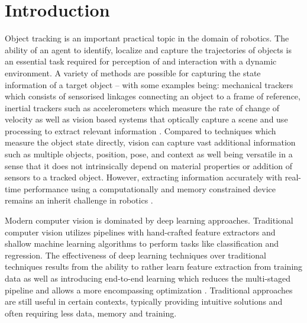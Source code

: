 \documentclass[a4paper,twoside,12pt]{report}
\begin{document}
\listoffigures
\newpage
{}
{}

\listoftables
\newpage
{}

\chapter{Introduction}

Object tracking is an important practical topic in the domain of robotics. The ability of an agent to identify, localize and capture the trajectories of objects is an essential task required for perception of and interaction with a dynamic environment. A variety of methods are possible for capturing the state information of a target object -- with some examples being: mechanical trackers which consists of sensorised linkages connecting an object to a frame of reference, inertial trackers such as accelerometers which measure the rate of change of velocity as well as vision based systems that optically capture a scene and use processing to extract relevant information \citep{track2}. Compared to techniques which measure the object state directly, vision can capture vast additional information such as multiple objects, position, pose,  and context as well being versatile in a sense that it does not intrinsically depend on material properties or addition of sensors to a tracked object. However, extracting information accurately with real-time performance using a computationally and memory constrained device remains an inherit challenge in robotics \citep{quantization, kalmannet}. 

Modern computer vision is dominated by deep learning approaches. Traditional computer vision utilizes pipelines with hand-crafted feature extractors and shallow machine learning algorithms to perform  tasks like classification and regression. The effectiveness of deep learning techniques over traditional techniques results from the ability to rather learn feature extraction from training data as well as introducing end-to-end learning which reduces the multi-staged pipeline and allows a more encompassing optimization \citep{tradvmod}. Traditional approaches are still useful in certain contexts, typically providing intuitive solutions and often requiring less data, memory and training.
\end{document}
